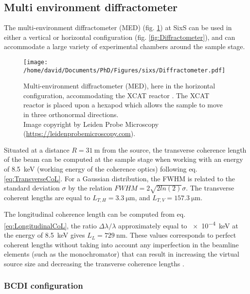 \subsection{Multi environment diffractometer}\label{sec:MED}

The multi-environment diffractometer (MED) (fig. \ref{fig:MEDDiffractometer}) at SixS can be used in either a vertical or horizontal configuration (fig. \ref{fig:Diffractometer}), and can accommodate a large variety of experimental chambers around the sample stage.

\begin{figure}[!htb]
    \centering
    \texttt{[image: /home/david/Documents/PhD/Figures/sixs/Diffractometer.pdf]}
    \caption{
        Multi-environment diffractometer (MED), here in the horizontal configuration, accommodating the XCAT reactor \parencite{VanRijn2010}.
        The XCAT reactor is placed upon a hexapod which allows the sample to move in three orthonormal directions.\\
        Image copyright by Leiden Probe Microscopy (\url{https://leidenprobemicroscopy.com}).
    }
    \label{fig:MEDDiffractometer}
\end{figure}

Situated at a distance $R = \qty{31}{\m}$ from the source, the transverse coherence length of the beam can be computed at the sample stage when working with an energy of \qty{8.5}{\keV} (working energy of the coherence optics) following eq. \ref{eq:TransverseCoL}.
For a Gaussian distribution, the FWHM is related to the standard deviation $\sigma$ by the relation $FWHM = 2\sqrt{2 ln (2) } \sigma$.
The transverse coherent lengths are equal to $L_{T,H} = \qty{3.3}{\um}$, and $L_{T,V} = \qty{157.3}{\um}$.

The longitudinal coherence length can be computed from eq. \ref{eq:LongitudinalCoL}, the ratio $\Delta\lambda/\lambda$ approximately equal to \qty{e-4}{\keV} at the energy of \qty{8.5}{\keV} gives $L_L = \qty{729}{\nm}$.
These values corresponds to perfect coherent lengths without taking into account any imperfection in the beamline elements (such as the monochromator) that can result in increasing the virtual source size and decreasing the transverse coherence lengths \parencite{Jacques2010}.

\subsubsection{BCDI configuration}

